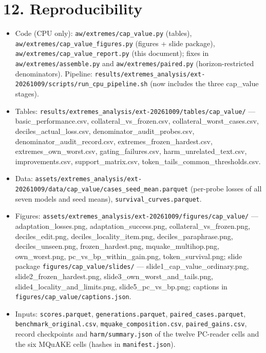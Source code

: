 \documentclass[10pt,a4paper]{article}
\begin{document}
\section*{12. Reproducibility}



\begin{itemize}
\item Code (CPU only): \texttt{aw/extremes/cap\_value.py} (tables), \texttt{aw/extremes/cap\_value\_figures.py} (figures + slide package), \texttt{aw/extremes/cap\_value\_report.py} (this document); fixes in \texttt{aw/extremes/assemble.py} and \texttt{aw/extremes/paired.py} (horizon-restricted denominators). Pipeline: \texttt{results/extremes\_analysis/ext-20261009/scripts/run\_cpu\_pipeline.sh} (now includes the three cap\_value stages).
\item Tables: \texttt{results/extremes\_analysis/ext-20261009/tables/cap\_value/} — basic\_performance.csv, collateral\_vs\_frozen.csv, collateral\_worst\_cases.csv, deciles\_actual\_loss.csv, denominator\_audit\_probes.csv, denominator\_audit\_record.csv, extremes\_frozen\_hardest.csv, extremes\_own\_worst.csv, gating\_failures.csv, harm\_unrelated\_text.csv, improvements.csv, support\_matrix.csv, token\_tails\_common\_thresholds.csv.
\item Data: \texttt{assets/extremes\_analysis/ext-20261009/data/cap\_value/cases\_seed\_mean.parquet} (per-probe losses of all seven models and seed means), \texttt{survival\_curves.parquet}.
\item Figures: \texttt{assets/extremes\_analysis/ext-20261009/figures/cap\_value/} — adaptation\_losses.png, adaptation\_success.png, collateral\_vs\_frozen.png, deciles\_edit.png, deciles\_locality\_item.png, deciles\_paraphrase.png, deciles\_unseen.png, frozen\_hardest.png, mquake\_multihop.png, own\_worst.png, pc\_vs\_bp\_within\_gain.png, token\_survival.png; slide package \texttt{figures/cap\_value/slides/} — slide1\_cap\_value\_ordinary.png, slide2\_frozen\_hardest.png, slide3\_own\_worst\_and\_tails.png, slide4\_locality\_and\_limits.png, slide5\_pc\_vs\_bp.png; captions in \texttt{figures/cap\_value/captions.json}.
\item Inputs: \texttt{scores.parquet}, \texttt{generations.parquet}, \texttt{paired\_cases.parquet}, \texttt{benchmark\_original.csv}, \texttt{mquake\_composition.csv}, \texttt{paired\_gains.csv}, record checkpoints and \texttt{harm/summary.json} of the twelve PC-reader cells and the six MQuAKE cells (hashes in \texttt{manifest.json}).
\end{itemize}
\end{document}
